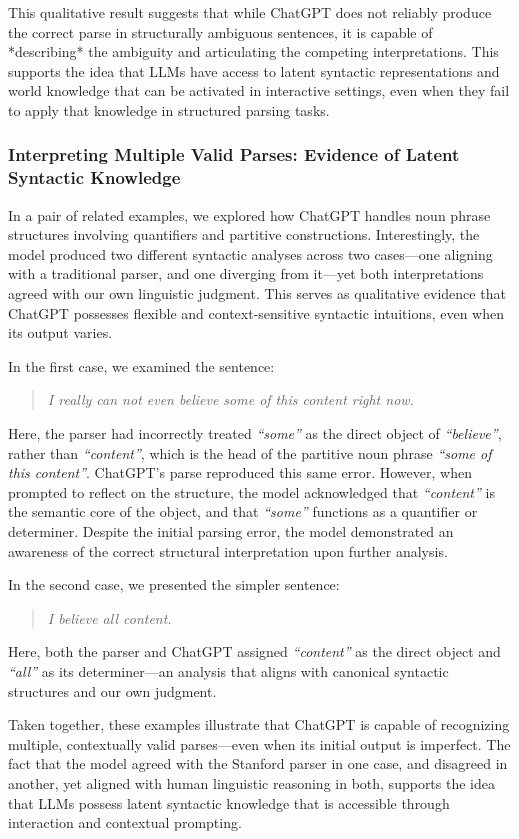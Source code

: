 This qualitative result suggests that while ChatGPT does not reliably produce the correct parse in structurally ambiguous sentences, it is capable of *describing* the ambiguity and articulating the competing interpretations. This supports the idea that LLMs have access to latent syntactic representations and world knowledge that can be activated in interactive settings, even when they fail to apply that knowledge in structured parsing tasks.

\subsubsection{Interpreting Multiple Valid Parses: Evidence of Latent Syntactic Knowledge}

In a pair of related examples, we explored how ChatGPT handles noun phrase structures involving quantifiers and partitive constructions. Interestingly, the model produced two different syntactic analyses across two cases—one aligning with a traditional parser, and one diverging from it—yet both interpretations agreed with our own linguistic judgment. This serves as qualitative evidence that ChatGPT possesses flexible and context-sensitive syntactic intuitions, even when its output varies.

In the first case, we examined the sentence:

\begin{quote}
    \textit{I really can not even believe some of this content right now.}
\end{quote}

Here, the parser had incorrectly treated \textit{“some”} as the direct object of \textit{“believe”}, rather than \textit{“content”}, which is the head of the partitive noun phrase \textit{“some of this content”}. ChatGPT's parse reproduced this same error. However, when prompted to reflect on the structure, the model acknowledged that \textit{“content”} is the semantic core of the object, and that \textit{“some”} functions as a quantifier or determiner. Despite the initial parsing error, the model demonstrated an awareness of the correct structural interpretation upon further analysis.

In the second case, we presented the simpler sentence:

\begin{quote}
    \textit{I believe all content.}
\end{quote}

Here, both the parser and ChatGPT assigned \textit{“content”} as the direct object and \textit{“all”} as its determiner—an analysis that aligns with canonical syntactic structures and our own judgment.

Taken together, these examples illustrate that ChatGPT is capable of recognizing multiple, contextually valid parses—even when its initial output is imperfect. The fact that the model agreed with the Stanford parser in one case, and disagreed in another, yet aligned with human linguistic reasoning in both, supports the idea that LLMs possess latent syntactic knowledge that is accessible through interaction and contextual prompting.
